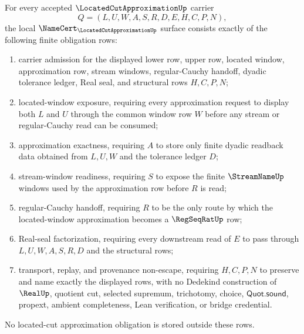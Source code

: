 \begin{theorem}
\label{thm:located-cut-approximation-namecert-obligations}
For every accepted $\LocatedCutApproximationUp$ carrier
$$
Q=(L,U,W,A,S,R,D,E,H,C,P,N),
$$
the local $\NameCert_{\LocatedCutApproximationUp}$ surface consists exactly of the following finite obligation rows:
\begin{enumerate}
\item carrier admission for the displayed lower row, upper row, located window, approximation row, stream windows, regular-Cauchy handoff, dyadic tolerance ledger, Real seal, and structural rows $H,C,P,N$;
\item located-window exposure, requiring every approximation request to display both $L$ and $U$ through the common window row $W$ before any stream or regular-Cauchy read can be consumed;
\item approximation exactness, requiring $A$ to store only finite dyadic readback data obtained from $L,U,W$ and the tolerance ledger $D$;
\item stream-window readiness, requiring $S$ to expose the finite $\StreamNameUp$ windows used by the approximation row before $R$ is read;
\item regular-Cauchy handoff, requiring $R$ to be the only route by which the located-window approximation becomes a $\RegSeqRatUp$ row;
\item Real-seal factorization, requiring every downstream read of $E$ to pass through $L,U,W,A,S,R,D$ and the structural rows;
\item transport, replay, and provenance non-escape, requiring $H,C,P,N$ to preserve and name exactly the displayed rows, with no Dedekind construction of $\RealUp$, quotient cut, selected supremum, trichotomy, choice, $\mathsf{Quot.sound}$, propext, ambient completeness, Lean verification, or bridge credential.
\end{enumerate}
No located-cut approximation obligation is stored outside these rows.
\end{theorem}
